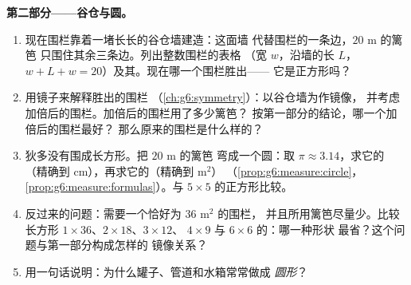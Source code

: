 \begin{problem}
\medskip
\noindent\textbf{第二部分——谷仓与圆。}
\begin{enumerate}[resume]
  \item 现在围栏靠着一堵长长的谷仓墙建造：这面墙
        代替围栏的一条边，$20$ m 的篱笆
        只围住其余三条边。列出整数围栏的表格
        （宽 $w$，沿墙的长 $L$，
        $w + L + w = 20$）及其。现在哪一个围栏胜出——
        它是正方形吗？
  \item 用镜子来解释胜出的围栏
        （\cref{ch:g6:symmetry}）：以谷仓墙为作镜像，
        并考虑加倍后的围栏。加倍后的围栏用了多少篱笆？
        按第一部分的结论，哪一个加倍后的围栏最好？
        那么原来的围栏是什么样的？
  \item 狄多没有围成长方形。把 $20$ m 的篱笆
        弯成一个圆：取 $\pi \approx 3.14$，求它的
        （精确到 cm），再求它的（精确到 m$^2$）
        （\cref{prop:g6:measure:circle}，
        \cref{prop:g6:measure:formulas}）。与
        $5 \times 5$ 的正方形比较。
  \item 反过来的问题：需要一个恰好为 $36$ m$^2$ 的围栏，
        并且所用篱笆尽量少。比较
        长方形 $1 \times 36$、$2 \times 18$、$3 \times 12$、
        $4 \times 9$ 与 $6 \times 6$ 的：哪一种形状
        最省？这个问题与第一部分构成怎样的
        镜像关系？
  \item 用一句话说明：为什么罐子、管道和水箱常常做成
        \emph{圆形}？
\end{enumerate}


\end{problem}

